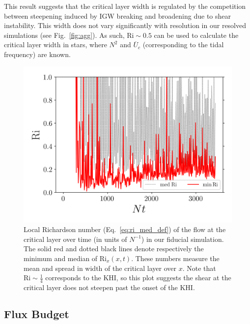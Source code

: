 \documentclass[
        fleqn,
        usenatbib,
    ]{mnras}
\begin{document}
This result suggests that the critical layer width is regulated by the
competition between steepening induced by IGW breaking and broadening due to
shear instability. This width does not vary significantly with resolution in our
resolved simulations (see Fig.~\ref{fig:agg}). As such, $\mathrm{Ri} \sim 0.5$
can be used to calculate the critical layer width in stars, where $N^2$ and
$\overline{U}_c$ (corresponding to the tidal frequency) are known.
\begin{figure}
    \centering
    \includegraphics[width=0.9\columnwidth]{plots/nl_f_ri.png}
    \caption{Local Richardson number (Eq.~\eqref{eq:ri_med_def}) of the flow at
    the critical layer over time (in units of $N^{-1}$) in our fiducial
    simulation. The solid red and dotted black lines denote respectively the
    minimum and median of $\mathrm{Ri}_x(x, t)$. These numbers measure the mean
    and spread in width of the critical layer over $x$. Note that $\mathrm{Ri}
    \sim \frac{1}{4}$ corresponds to the KHI, so this plot suggests the shear at
    the critical layer does not steepen past the onset of the
    KHI.}\label{fig:nl_f_ri}
\end{figure}

\subsection{Flux Budget}\label{ss:flux_budget}
\end{document}
